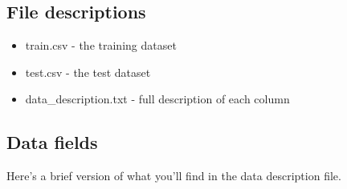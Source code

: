 \documentclass[11pt]{article}
\providecommand{\tightlist}{%
      \setlength{\itemsep}{0pt}\setlength{\parskip}{0pt}}
\begin{document}
\subsection{File descriptions}\label{file-descriptions}

\begin{itemize}
\tightlist
\item
  train.csv - the training dataset
\item
  test.csv - the test dataset
\item
  data\_description.txt - full description of each column
\end{itemize}

\subsection{Data fields}\label{data-fields}

Here's a brief version of what you'll find in the data description file.
\end{document}
